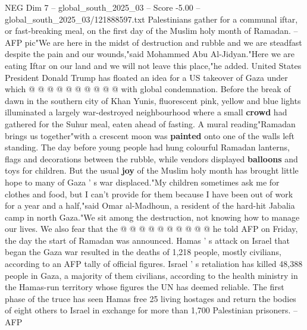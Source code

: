 \begin{textsample}{NEG Dim 7 – global\_south\_2025\_03 – Score -5.00 – global\_south\_2025\_03/121888597.txt}
Palestinians gather for a communal iftar, or fast-breaking meal, on the first day of the Muslim holy month of Ramadan. -- AFP pic"We are here in the midst of destruction and rubble and we are steadfast despite the pain and our wounds,"said Mohammed Abu Al-Jidyan."Here we are eating Iftar on our land and we will not leave this place,"he added.
United States President Donald Trump has floated an idea for a US takeover of Gaza under which @ @ @ @ @ @ @ @ @ @ with global condemnation.
Before the break of dawn in the southern city of Khan Yunis, fluorescent pink, yellow and blue lights illuminated a largely war-destroyed neighbourhood where a small \textbf{crowd} had gathered for the Suhur meal, eaten ahead of fasting.
A mural reading"Ramadan brings us together"with a crescent moon was \textbf{painted} onto one of the walls left standing.
The day before young people had hung colourful Ramadan lanterns, flags and decorations between the rubble, while vendors displayed \textbf{balloons} and toys for children.
But the usual \textbf{joy} of the Muslim holy month has brought little hope to many of Gaza ' s war displaced."My children sometimes ask me for clothes and food, but I can't provide for them because I have been out of work for a year and a half,"said Omar al-Madhoun, a resident of the hard-hit Jabalia camp in north Gaza."We sit among the destruction, not knowing how to manage our lives.
We also fear that the @ @ @ @ @ @ @ @ @ @ he told AFP on Friday, the day the start of Ramadan was announced.
Hamas ' s attack on Israel that began the Gaza war resulted in the deaths of 1,218 people, mostly civilians, according to an AFP tally of official figures.
Israel ' s retaliation has killed 48,388 people in Gaza, a majority of them civilians, according to the health ministry in the Hamas-run territory whose figures the UN has deemed reliable.
The first phase of the truce has seen Hamas free 25 living hostages and return the bodies of eight others to Israel in exchange for more than 1,700 Palestinian prisoners. -- AFP

\end{textsample}
